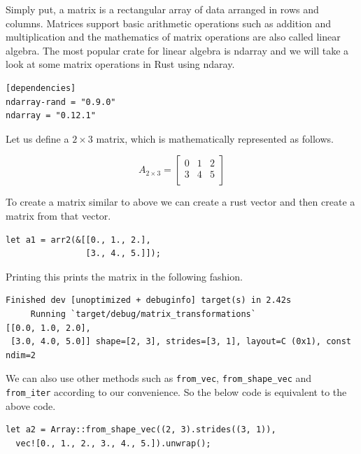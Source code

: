 \documentclass{book}
\begin{document}
Simply put, a matrix is a rectangular array of data arranged in rows and columns. Matrices support basic arithmetic operations such as addition and multiplication and the mathematics of matrix operations are also called linear algebra. The most popular crate for linear algebra is ndarray and we will take a look at some matrix operations in Rust using ndaray.

\begin{lstlisting}[caption={Cargo\\.toml},basicstyle=\small]
[dependencies]
ndarray-rand = "0.9.0"
ndarray = "0.12.1"
\end{lstlisting}

Let us define a $2 \times 3$ matrix, which is mathematically represented as follows.

\begin{equation}
	A_{2 \times 3} = 
	\begin{bmatrix}
            0 & 1 & 2  \\
            3 & 4 & 5 \\
    \end{bmatrix}
\end{equation}

To create a matrix similar to above we can create a rust vector and then create a matrix from that vector.

\begin{lstlisting}[caption={},basicstyle=\small]
let a1 = arr2(&[[0., 1., 2.],
                [3., 4., 5.]]);
\end{lstlisting}

Printing this prints the matrix in the following fashion.

\begin{lstlisting}[caption={},basicstyle=\small]
    Finished dev [unoptimized + debuginfo] target(s) in 2.42s
     Running `target/debug/matrix_transformations`
[[0.0, 1.0, 2.0],
 [3.0, 4.0, 5.0]] shape=[2, 3], strides=[3, 1], layout=C (0x1), const ndim=2
\end{lstlisting}

We can also use other methods such as \lstinline{from_vec}, \lstinline{from_shape_vec} and \lstinline{from_iter} according to our convenience. So the below code is equivalent to the above code.

\begin{lstlisting}[caption={},basicstyle=\small]
let a2 = Array::from_shape_vec((2, 3).strides((3, 1)),
  vec![0., 1., 2., 3., 4., 5.]).unwrap();
\end{lstlisting}
\end{document}
